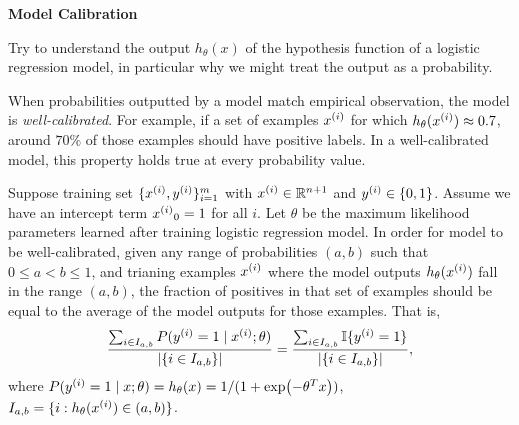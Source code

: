 \documentclass[12pt,letterpaper,boxed]{hmcpset}
\newcommand{\ind}[1]{\mathbb{I}\{#1\}}
\begin{document}
\begin{problem}[Problem 2]
  \textbf{Model Calibration}

  Try to understand the output $h_\theta (x)$ of the hypothesis function of a logistic regression model, in particular why we might treat the output as a probability.

  When probabilities outputted by a model match empirical observation, the model is \emph{well-calibrated}. For example, if a set of examples $\xx$ for which $h_\theta(\xx) \approx 0.7$, around $70\%$ of those examples should have positive labels. In a well-calibrated model, this property holds true at every probability value. 

  Suppose training set $\{\xx, \yy\}_{i=1}^m$ with $\xx \in \R^{n+1}$ and $\yy \in \{0,1\}$. Assume we have an intercept term $\xx_0 = 1$ for all $i$. Let $\theta$ be the maximum likelihood parameters learned after training logistic regression model. In order for model to be well-calibrated, given any range of probabilities $(a,b)$ such that $0 \leq a < b \leq 1$, and trianing examples $\xx$ where the model outputs $h_\theta (\xx)$ fall in the range $(a,b)$, the fraction of positives in that set of examples should be equal to the average of the model outputs for those examples. That is,
  \[
  \frac{\sum_{i \in I_{a,b}} P(\yy = 1 \mid \xx; \theta)}{\abs{\{i \in I_{a,b}\}}} = \frac{\sum_{i \in I_{a,b}} \ind{\yy = 1}}{\abs{ \{i \in I_{a,b}\} }},
  \]
  where $P(\yy = 1 \mid x; \theta) = h_{\theta} (x) = 1/(1+\exp(-\theta^T x))$, $I_{a,b} = \{i : h_\theta(\xx) \in (a,b) \}$.
\end{problem}
\end{document}

